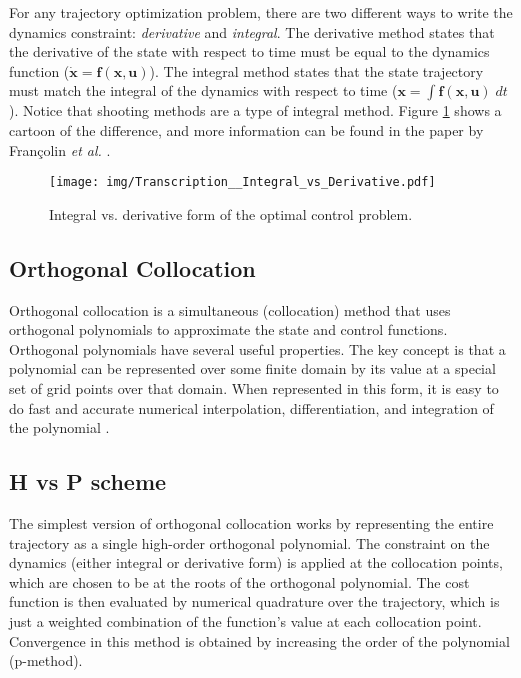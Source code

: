 For any trajectory optimization problem, there are two different ways to write the dynamics constraint: {\em derivative} and {\em integral}. The derivative method states that the derivative of the state with respect to time must be equal to the dynamics function ($\dot{\mathbf{x}} = \mathbf{f}(\mathbf{x}, \mathbf{u})$). The integral method states that the state trajectory must match the integral of the dynamics with respect to time ($\mathbf{x} = \int \mathbf{f}(\mathbf{x}, \mathbf{u}) \; dt$). Notice that shooting methods are a type of integral method. Figure \ref{fig:Integral_vs_Derivative} shows a cartoon of the difference, and more information can be found in the paper by Fran\c{c}olin {\em et al.} \cite{Franc}.

\begin{figure}
\centering
\texttt{[image: img/Transcription\_\_Integral\_vs\_Derivative.pdf]}
\caption{Integral vs. derivative form of the optimal control problem.}
\label{fig:Integral_vs_Derivative}
\end{figure}

\subsection{Orthogonal Collocation}

Orthogonal collocation \footnotemark is a simultaneous (collocation) method that uses orthogonal polynomials to approximate the state and control functions. Orthogonal polynomials have several useful properties. The key concept is that a polynomial can be represented over some finite domain by its value at a special set of grid points over that domain. When represented in this form, it is easy to do fast and accurate numerical interpolation, differentiation, and integration of the polynomial \cite{Berrut2004}. 



\subsection{H vs P scheme}

\par The simplest version of orthogonal collocation works by representing the entire trajectory as a single high-order orthogonal polynomial. The constraint on the dynamics (either integral or derivative form) is applied at the collocation points, which are chosen to be at the roots of the orthogonal polynomial. The cost function is then evaluated by numerical quadrature over the trajectory, which is just a weighted combination of the function's value at each collocation point. Convergence in this method is obtained by increasing the order of the polynomial (p-method). 

